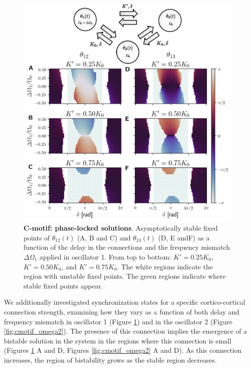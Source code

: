 \documentclass[../main.tex]{subfiles}
\begin{document}
\begin{figure}[!htb]
    \centering
    \includegraphics[width=\textwidth]{chapter2/figures/cmotif_different_omega_0_edited.png}
    \caption{\textbf{C-motif: phase-locked solutions}.
    Asymptotically stable fixed points of $\theta_{12}(t)$ (A, B and C) and $\theta_{13}(t)$ (D, E andF) as a function of the delay in the connections and the frequency mismatch $\Delta\Omega_1$ applied in oscillator 1.
    From top to bottom: $K'=0.25K_0$, $K'=0.50K_0$, and $K'=0.75K_0$.
    The white regions indicate the region with unstable fixed points.
    The green regions indicate where stable fixed points appear.}
    \label{fig:cmotif_omega1}
\end{figure}
We additionally investigated synchronization states for a specific cortico-cortical connection strength, examining how they vary as a function of both delay and frequency mismatch in oscillator 1 (Figure \ref{fig:cmotif_omega1}) and in the oscillator 2 (Figure \ref{fig:cmotif_omega2}).
The presence of this connection implies the emergence of a bistable solution in the system in the regions where this connection is small (Figures \ref{fig:cmotif_omega1} A and D, Figures \ref{fig:cmotif_omega2} A and D).
As this connection increases, the region of bistability grows as the stable region decreases.
\end{document}
